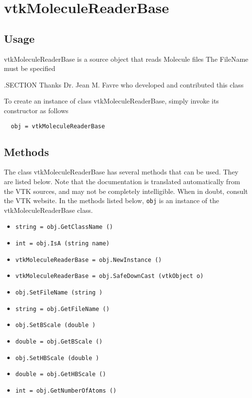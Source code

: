 \section{vtkMoleculeReaderBase}

\subsection{Usage}

 vtkMoleculeReaderBase is a source object that reads Molecule files
 The FileName must be specified

 .SECTION Thanks
 Dr. Jean M. Favre who developed and contributed this class

To create an instance of class vtkMoleculeReaderBase, simply
invoke its constructor as follows
\begin{verbatim}
  obj = vtkMoleculeReaderBase
\end{verbatim}
\subsection{Methods}

The class vtkMoleculeReaderBase has several methods that can be used.
  They are listed below.
Note that the documentation is translated automatically from the VTK sources,
and may not be completely intelligible.  When in doubt, consult the VTK website.
In the methods listed below, \verb|obj| is an instance of the vtkMoleculeReaderBase class.
\begin{itemize}
\item  \verb|string = obj.GetClassName ()|

\item  \verb|int = obj.IsA (string name)|

\item  \verb|vtkMoleculeReaderBase = obj.NewInstance ()|

\item  \verb|vtkMoleculeReaderBase = obj.SafeDownCast (vtkObject o)|

\item  \verb|obj.SetFileName (string )|

\item  \verb|string = obj.GetFileName ()|

\item  \verb|obj.SetBScale (double )|

\item  \verb|double = obj.GetBScale ()|

\item  \verb|obj.SetHBScale (double )|

\item  \verb|double = obj.GetHBScale ()|

\item  \verb|int = obj.GetNumberOfAtoms ()|

\end{itemize}
